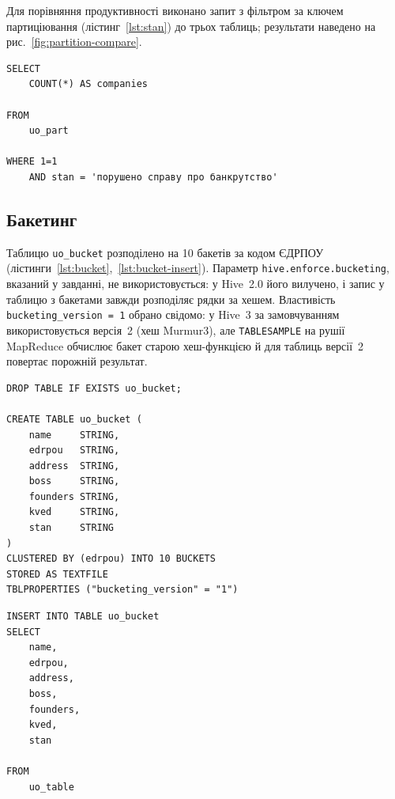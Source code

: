\documentclass{iasa-lab}
\begin{document}

Для порівняння продуктивності виконано запит з фільтром за ключем партиціювання (лістинг~\ref{lst:stan}) до трьох таблиць; результати наведено на рис.~\ref{fig:partition-compare}.

\begin{lstlisting}[language=HiveQL, caption={Запит з фільтром за станом юридичної особи}, label={lst:stan}]
SELECT
    COUNT(*) AS companies

FROM
    uo_part

WHERE 1=1
    AND stan = 'порушено справу про банкрутство'
\end{lstlisting}


\subsection{Бакетинг}

Таблицю \texttt{uo\_bucket} розподілено на 10 бакетів за кодом ЄДРПОУ (лістинги~\ref{lst:bucket},~\ref{lst:bucket-insert}). Параметр \texttt{hive.enforce.bucketing}, вказаний у завданні, не використовується: у Hive~2.0 його вилучено, і запис у таблицю з бакетами завжди розподіляє рядки за хешем. Властивість \texttt{bucketing\_version = 1} обрано свідомо: у Hive~3 за замовчуванням використовується версія~2 (хеш Murmur3), але \texttt{TABLESAMPLE} на рушії MapReduce обчислює бакет старою хеш-функцією й для таблиць версії~2 повертає порожній результат.

\begin{lstlisting}[language=HiveQL, caption={Створення таблиці з бакетами uo\_bucket}, label={lst:bucket}]
DROP TABLE IF EXISTS uo_bucket;

CREATE TABLE uo_bucket (
    name     STRING,
    edrpou   STRING,
    address  STRING,
    boss     STRING,
    founders STRING,
    kved     STRING,
    stan     STRING
)
CLUSTERED BY (edrpou) INTO 10 BUCKETS
STORED AS TEXTFILE
TBLPROPERTIES ("bucketing_version" = "1")
\end{lstlisting}

\begin{lstlisting}[language=HiveQL, caption={Наповнення таблиці uo\_bucket}, label={lst:bucket-insert}]
INSERT INTO TABLE uo_bucket
SELECT
    name,
    edrpou,
    address,
    boss,
    founders,
    kved,
    stan

FROM
    uo_table
\end{lstlisting}
\end{document}

